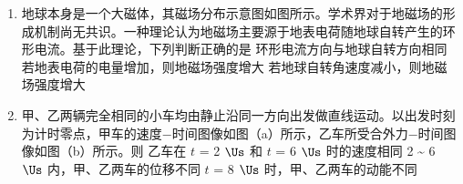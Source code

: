 \documentclass[\gkver]{gaokaozhenti}
\begin{document}
\begin{enumerate}
{故 P-x 图像为开口向上的抛物线，由于 F 和 v 都在减小，故 P 在减小，故 CD 错误。故选 A。


二、多项选择题：本题共4小题，每小题6分，共24分．每小题有多项符合题目要求，全部选对的得6分，选对但不全的得3分，有选错的得0分.
}

\item
地球本身是一个大磁体，其磁场分布示意图如图所示。学术界对于地磁场的形成机制尚无共识。一种理论认为地磁场主要源于地表电荷随地球自转产生的环形电流。基于此理论，下列判断正确的是
{环形电流方向与地球自转方向相同}
{若地表电荷的电量增加，则地磁场强度增大}
{若地球自转角速度减小，则地磁场强度增大}

\item
甲、乙两辆完全相同的小车均由静止沿同一方向出发做直线运动。以出发时刻为计时零点，甲车的速度$-$时间图像如图（a）所示，乙车所受合外力$-$时间图像如图（b）所示。则
{乙车在 $t$ = 2 $\Us$ 和 $t$ = 6 $\Us$ 时的速度相同}
{2 \textasciitilde{} 6 $\Us$ 内，甲、乙两车的位移不同}
{$t$ = 8 $\Us$ 时，甲、乙两车的动能不同}
\end{enumerate}
\end{document}
